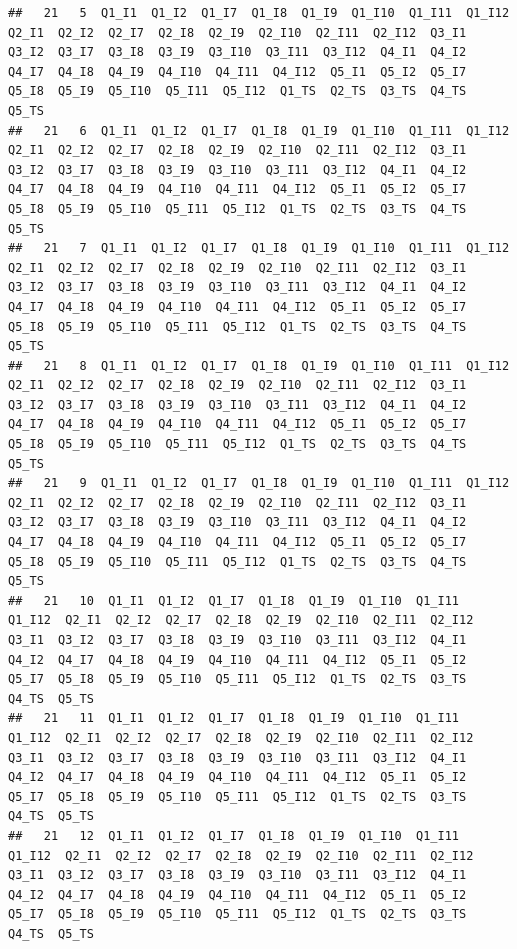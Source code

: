 \documentclass[
]{book}
\begin{document}
\begin{verbatim}
##   21   5  Q1_I1  Q1_I2  Q1_I7  Q1_I8  Q1_I9  Q1_I10  Q1_I11  Q1_I12  Q2_I1  Q2_I2  Q2_I7  Q2_I8  Q2_I9  Q2_I10  Q2_I11  Q2_I12  Q3_I1  Q3_I2  Q3_I7  Q3_I8  Q3_I9  Q3_I10  Q3_I11  Q3_I12  Q4_I1  Q4_I2  Q4_I7  Q4_I8  Q4_I9  Q4_I10  Q4_I11  Q4_I12  Q5_I1  Q5_I2  Q5_I7  Q5_I8  Q5_I9  Q5_I10  Q5_I11  Q5_I12  Q1_TS  Q2_TS  Q3_TS  Q4_TS  Q5_TS
##   21   6  Q1_I1  Q1_I2  Q1_I7  Q1_I8  Q1_I9  Q1_I10  Q1_I11  Q1_I12  Q2_I1  Q2_I2  Q2_I7  Q2_I8  Q2_I9  Q2_I10  Q2_I11  Q2_I12  Q3_I1  Q3_I2  Q3_I7  Q3_I8  Q3_I9  Q3_I10  Q3_I11  Q3_I12  Q4_I1  Q4_I2  Q4_I7  Q4_I8  Q4_I9  Q4_I10  Q4_I11  Q4_I12  Q5_I1  Q5_I2  Q5_I7  Q5_I8  Q5_I9  Q5_I10  Q5_I11  Q5_I12  Q1_TS  Q2_TS  Q3_TS  Q4_TS  Q5_TS
##   21   7  Q1_I1  Q1_I2  Q1_I7  Q1_I8  Q1_I9  Q1_I10  Q1_I11  Q1_I12  Q2_I1  Q2_I2  Q2_I7  Q2_I8  Q2_I9  Q2_I10  Q2_I11  Q2_I12  Q3_I1  Q3_I2  Q3_I7  Q3_I8  Q3_I9  Q3_I10  Q3_I11  Q3_I12  Q4_I1  Q4_I2  Q4_I7  Q4_I8  Q4_I9  Q4_I10  Q4_I11  Q4_I12  Q5_I1  Q5_I2  Q5_I7  Q5_I8  Q5_I9  Q5_I10  Q5_I11  Q5_I12  Q1_TS  Q2_TS  Q3_TS  Q4_TS  Q5_TS
##   21   8  Q1_I1  Q1_I2  Q1_I7  Q1_I8  Q1_I9  Q1_I10  Q1_I11  Q1_I12  Q2_I1  Q2_I2  Q2_I7  Q2_I8  Q2_I9  Q2_I10  Q2_I11  Q2_I12  Q3_I1  Q3_I2  Q3_I7  Q3_I8  Q3_I9  Q3_I10  Q3_I11  Q3_I12  Q4_I1  Q4_I2  Q4_I7  Q4_I8  Q4_I9  Q4_I10  Q4_I11  Q4_I12  Q5_I1  Q5_I2  Q5_I7  Q5_I8  Q5_I9  Q5_I10  Q5_I11  Q5_I12  Q1_TS  Q2_TS  Q3_TS  Q4_TS  Q5_TS
##   21   9  Q1_I1  Q1_I2  Q1_I7  Q1_I8  Q1_I9  Q1_I10  Q1_I11  Q1_I12  Q2_I1  Q2_I2  Q2_I7  Q2_I8  Q2_I9  Q2_I10  Q2_I11  Q2_I12  Q3_I1  Q3_I2  Q3_I7  Q3_I8  Q3_I9  Q3_I10  Q3_I11  Q3_I12  Q4_I1  Q4_I2  Q4_I7  Q4_I8  Q4_I9  Q4_I10  Q4_I11  Q4_I12  Q5_I1  Q5_I2  Q5_I7  Q5_I8  Q5_I9  Q5_I10  Q5_I11  Q5_I12  Q1_TS  Q2_TS  Q3_TS  Q4_TS  Q5_TS
##   21   10  Q1_I1  Q1_I2  Q1_I7  Q1_I8  Q1_I9  Q1_I10  Q1_I11  Q1_I12  Q2_I1  Q2_I2  Q2_I7  Q2_I8  Q2_I9  Q2_I10  Q2_I11  Q2_I12  Q3_I1  Q3_I2  Q3_I7  Q3_I8  Q3_I9  Q3_I10  Q3_I11  Q3_I12  Q4_I1  Q4_I2  Q4_I7  Q4_I8  Q4_I9  Q4_I10  Q4_I11  Q4_I12  Q5_I1  Q5_I2  Q5_I7  Q5_I8  Q5_I9  Q5_I10  Q5_I11  Q5_I12  Q1_TS  Q2_TS  Q3_TS  Q4_TS  Q5_TS
##   21   11  Q1_I1  Q1_I2  Q1_I7  Q1_I8  Q1_I9  Q1_I10  Q1_I11  Q1_I12  Q2_I1  Q2_I2  Q2_I7  Q2_I8  Q2_I9  Q2_I10  Q2_I11  Q2_I12  Q3_I1  Q3_I2  Q3_I7  Q3_I8  Q3_I9  Q3_I10  Q3_I11  Q3_I12  Q4_I1  Q4_I2  Q4_I7  Q4_I8  Q4_I9  Q4_I10  Q4_I11  Q4_I12  Q5_I1  Q5_I2  Q5_I7  Q5_I8  Q5_I9  Q5_I10  Q5_I11  Q5_I12  Q1_TS  Q2_TS  Q3_TS  Q4_TS  Q5_TS
##   21   12  Q1_I1  Q1_I2  Q1_I7  Q1_I8  Q1_I9  Q1_I10  Q1_I11  Q1_I12  Q2_I1  Q2_I2  Q2_I7  Q2_I8  Q2_I9  Q2_I10  Q2_I11  Q2_I12  Q3_I1  Q3_I2  Q3_I7  Q3_I8  Q3_I9  Q3_I10  Q3_I11  Q3_I12  Q4_I1  Q4_I2  Q4_I7  Q4_I8  Q4_I9  Q4_I10  Q4_I11  Q4_I12  Q5_I1  Q5_I2  Q5_I7  Q5_I8  Q5_I9  Q5_I10  Q5_I11  Q5_I12  Q1_TS  Q2_TS  Q3_TS  Q4_TS  Q5_TS

\end{verbatim}
\end{document}
